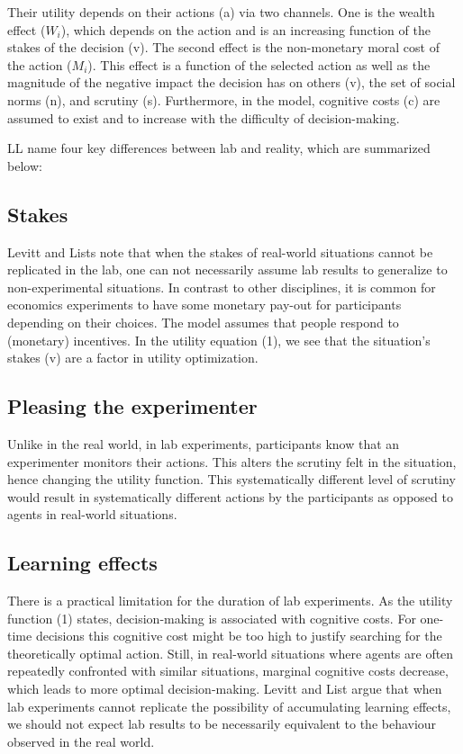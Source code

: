 \documentclass{article}
\begin{document}
Their utility depends on their actions (a) via two channels. One is the wealth effect ($W_i$), which depends on the action and is an increasing function of the stakes of the decision (v). The second effect is the non-monetary moral cost of the action ($M_i$). This effect is a function of the selected action as well as the magnitude of the negative impact the decision has on others (v), the set of social norms (n), and scrutiny (s). Furthermore, in the model, cognitive costs (c) are assumed to exist and to increase with the difficulty of decision-making.

LL name four key differences between lab and reality, which are summarized below: 

\subsection*{Stakes}

Levitt and Lists note that when the stakes of real-world situations cannot be replicated in the lab, one can not necessarily assume lab results to generalize to non-experimental situations. In contrast to other disciplines, it is common for economics experiments to have some monetary pay-out for participants depending on their choices. The model assumes that people respond to (monetary) incentives. In the utility equation (1), we see that the situation's stakes (v) are a factor in utility optimization.

\subsection*{Pleasing the experimenter}

Unlike in the real world, in lab experiments, participants know that an experimenter monitors their actions. This alters the scrutiny felt in the situation, hence changing the utility function. This systematically different level of scrutiny would result in systematically different actions by the participants as opposed to agents in real-world situations. 

\subsection*{Learning effects}

There is a practical limitation for the duration of lab experiments. As the utility function (1) states, decision-making is associated with cognitive costs. For one-time decisions this cognitive cost might be too high to justify searching for the theoretically optimal action. Still, in real-world situations where agents are often repeatedly confronted with similar situations, marginal cognitive costs decrease, which leads to more optimal decision-making. Levitt and List argue that when lab experiments cannot replicate the possibility of accumulating learning effects, we should not expect lab results to be necessarily equivalent to the behaviour observed in the real world. 
\end{document}
